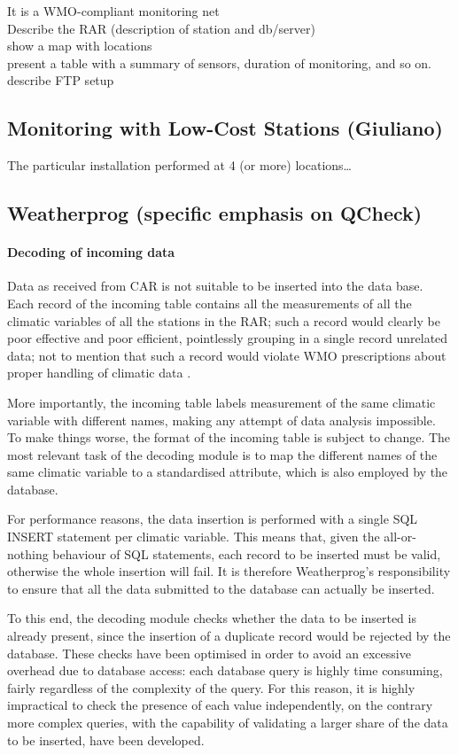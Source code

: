 \documentclass[authoryear,preprint,review,12pt]{elsarticle}
\begin{document}
It is a WMO-compliant monitoring net\\
Describe the RAR (description of station and db/server)\\
show a map with locations\\
present a table with a summary of sensors, duration of monitoring, and so on. \\
describe FTP setup


\subsection{Monitoring with Low-Cost Stations (Giuliano)}
The particular installation performed at 4 (or more) locations\ldots

\subsection{Weatherprog (specific emphasis on QCheck)}
 \paragraph{Decoding of incoming data} Data as received from CAR is not suitable to be inserted into the data base. Each record of the incoming table contains all the measurements of all the climatic variables of all the stations in the RAR; such a record would clearly be poor effective and poor efficient, pointlessly grouping in a single record unrelated data; not to mention that such a record would violate WMO prescriptions about proper handling of climatic data \citep{wcdmp:cdms}.
 
 More importantly, the incoming table labels measurement of the same climatic variable with different names, making any attempt of data analysis impossible. To make things worse, the format of the incoming table is subject to change. The most relevant task of the decoding module is to map the different names of the same climatic variable to a standardised attribute, which is also employed by the database.
 
 For performance reasons, the data insertion is performed with a single SQL INSERT statement per climatic variable. This means that, given the all-or-nothing behaviour of SQL statements, each record to be inserted must be valid, otherwise the whole insertion will fail. It is therefore Weatherprog's responsibility to ensure that all the data submitted to the database can actually be inserted.
 
 To this end, the decoding module checks whether the data to be inserted is already present, since the insertion of a duplicate record would be rejected by the database. These checks have been optimised in order to avoid an excessive overhead due to database access: each database query is highly time consuming, fairly regardless of the complexity of the query. For this reason, it is highly impractical to check the presence of each value independently, on the contrary more complex queries, with the capability of validating a larger share of the data to be inserted, have been developed.
 
\end{document}

